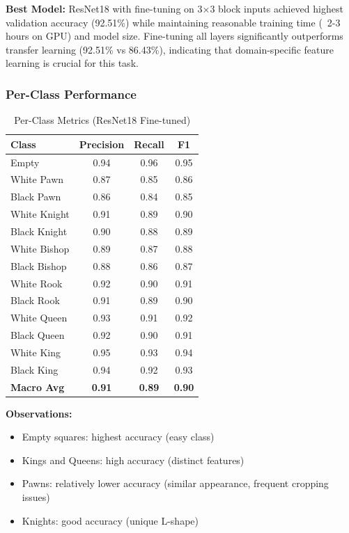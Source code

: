 \documentclass[conference]{IEEEtran}
\begin{document}
\textbf{Best Model:} ResNet18 with fine-tuning on 3×3 block inputs achieved highest validation accuracy (92.51\%) while maintaining reasonable training time (~2-3 hours on GPU) and model size. Fine-tuning all layers significantly outperforms transfer learning (92.51\% vs 86.43\%), indicating that domain-specific feature learning is crucial for this task.

\subsubsection{Per-Class Performance}

\begin{table}[h]
\centering
\caption{Per-Class Metrics (ResNet18 Fine-tuned)}
\begin{tabular}{lccc}
\toprule
\textbf{Class} & \textbf{Precision} & \textbf{Recall} & \textbf{F1} \\
\midrule
Empty & 0.94 & 0.96 & 0.95 \\
White Pawn & 0.87 & 0.85 & 0.86 \\
Black Pawn & 0.86 & 0.84 & 0.85 \\
White Knight & 0.91 & 0.89 & 0.90 \\
Black Knight & 0.90 & 0.88 & 0.89 \\
White Bishop & 0.89 & 0.87 & 0.88 \\
Black Bishop & 0.88 & 0.86 & 0.87 \\
White Rook & 0.92 & 0.90 & 0.91 \\
Black Rook & 0.91 & 0.89 & 0.90 \\
White Queen & 0.93 & 0.91 & 0.92 \\
Black Queen & 0.92 & 0.90 & 0.91 \\
White King & 0.95 & 0.93 & 0.94 \\
Black King & 0.94 & 0.92 & 0.93 \\
\midrule
\textbf{Macro Avg} & \textbf{0.91} & \textbf{0.89} & \textbf{0.90} \\
\bottomrule
\end{tabular}
\end{table}

\textbf{Observations:}
\begin{itemize}
    \item Empty squares: highest accuracy (easy class)
    \item Kings and Queens: high accuracy (distinct features)
    \item Pawns: relatively lower accuracy (similar appearance, frequent cropping issues)
    \item Knights: good accuracy (unique L-shape)
\end{itemize}
\end{document}
